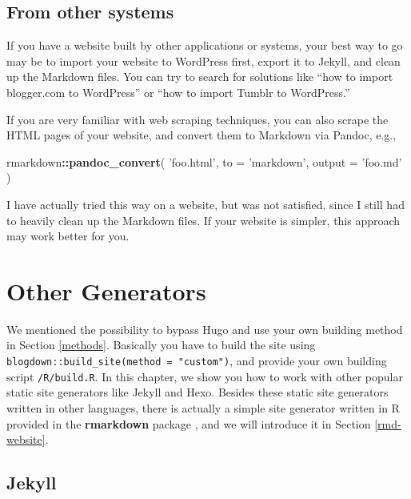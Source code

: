 \documentclass[12pt,]{krantz}
\makeatletter
\newenvironment{Shaded}{\begin{snugshade}}{\end{snugshade}}
\newcommand{\DataTypeTok}[1]{\textcolor[rgb]{0.13,0.29,0.53}{#1}}
\newcommand{\KeywordTok}[1]{\textcolor[rgb]{0.13,0.29,0.53}{\textbf{#1}}}
\newcommand{\NormalTok}[1]{#1}
\newcommand{\OperatorTok}[1]{\textcolor[rgb]{0.81,0.36,0.00}{\textbf{#1}}}
\newcommand{\StringTok}[1]{\textcolor[rgb]{0.31,0.60,0.02}{#1}}
\newenvironment{kframe}{%
\medskip{}
\setlength{\fboxsep}{.8em}
 \def\at@end@of@kframe{}%
 \ifinner\ifhmode%
  \def\at@end@of@kframe{\end{minipage}}%
  \begin{minipage}{\columnwidth}%
 \fi\fi%
 \def\FrameCommand##1{\hskip\@totalleftmargin \hskip-\fboxsep
 \colorbox{shadecolor}{##1}\hskip-\fboxsep
     \hskip-\linewidth \hskip-\@totalleftmargin \hskip\columnwidth}%
 \MakeFramed {\advance\hsize-\width
   \@totalleftmargin\z@ \linewidth\hsize
   \@setminipage}}%
 {\par\unskip\endMakeFramed%
 \at@end@of@kframe}
\renewenvironment{Shaded}{\begin{kframe}}{\end{kframe}}
\theoremstyle{definition}
\theoremstyle{definition}
\theoremstyle{definition}
\theoremstyle{remark}
\makeatother
\begin{document}
\hypertarget{from-other-systems}{%
\section{From other systems}\label{from-other-systems}}

If you have a website built by other applications or systems, your best
way to go may be to import your website to WordPress first, export it to
Jekyll, and clean up the Markdown files. You can try to search for
solutions like ``how to import blogger.com to WordPress'' or ``how to
import Tumblr to WordPress.''

If you are very familiar with web scraping techniques, you can also
scrape the HTML pages of your website, and convert them to Markdown via
Pandoc, e.g.,

\begin{Shaded}
\begin{Highlighting}[]
\NormalTok{rmarkdown}\OperatorTok{::}\KeywordTok{pandoc_convert}\NormalTok{(}
  \StringTok{'foo.html'}\NormalTok{, }\DataTypeTok{to =} \StringTok{'markdown'}\NormalTok{, }\DataTypeTok{output =} \StringTok{'foo.md'}
\NormalTok{)}
\end{Highlighting}
\end{Shaded}

I have actually tried this way on a website, but was not satisfied,
since I still had to heavily clean up the Markdown files. If your
website is simpler, this approach may work better for you.

\hypertarget{other-generators}{%
\chapter{Other Generators}\label{other-generators}}

We mentioned the possibility to bypass Hugo and use your own building
method in Section \ref{methods}. Basically you have to build the site
using \texttt{blogdown::build\_site(method\ =\ "custom")}, and provide
your own building script \texttt{/R/build.R}. In this chapter, we show
you how to work with other popular static site generators like Jekyll
and Hexo. Besides these static site generators written in other
languages, there is actually a simple site generator written in R
provided in the \textbf{rmarkdown} package \citep{R-rmarkdown}, and we
will introduce it in Section \ref{rmd-website}.

\hypertarget{jekyll}{%
\section{Jekyll}\label{jekyll}}
\end{document}
